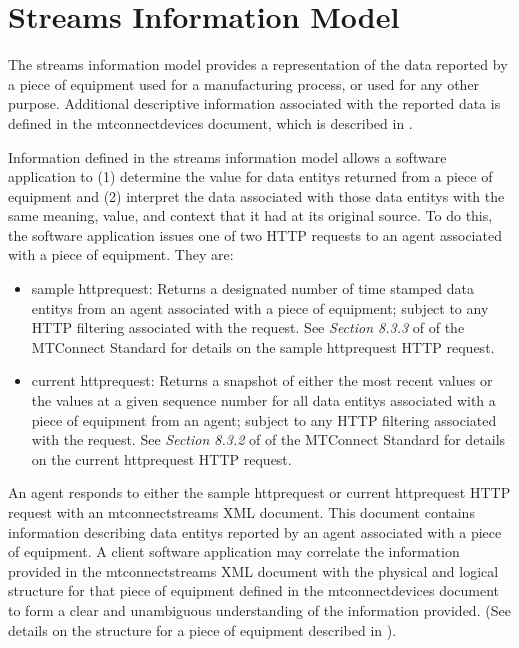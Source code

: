 \section{Streams Information Model}
\label{sec:Streams Information Model}

The \gls{streams information model} provides a representation of the data reported by a piece of equipment used for a manufacturing process, or used for any other purpose.  Additional descriptive information associated with the reported data is defined in the \gls{mtconnectdevices} document, which is described in .

Information defined in the \gls{streams information model} allows a software application to (1) determine the value for \glspl{data entity} returned from a piece of equipment and (2) interpret the data associated with those \glspl{data entity} with the same meaning, value, and context that it had at its original source.  To do this, the software application issues one of two HTTP requests to an \gls{agent} associated with a piece of equipment.  They are:


\begin{itemize}
\item \gls{sample httprequest}:  Returns a designated number of time stamped \glspl{data entity} from an \gls{agent} associated with a piece of equipment; subject to any HTTP filtering associated with the request.  See \textit{Section 8.3.3} of  of the MTConnect Standard for details on the \gls{sample httprequest} HTTP request.

\item \gls{current httprequest}:  Returns a snapshot of either the most recent values or the values at a given sequence number for all \glspl{data entity} associated with a piece of equipment from an \gls{agent}; subject to any HTTP filtering associated with the request.  See \textit{Section 8.3.2} of  of the MTConnect Standard for details on the \gls{current httprequest} HTTP request.
\end{itemize}

An \gls{agent} responds to either the \gls{sample httprequest} or \gls{current httprequest} HTTP request with an \linebreak\gls{mtconnectstreams} XML document.  This document contains information describing \glspl{data entity} reported by an \gls{agent} associated with a piece of equipment.   A client software application may correlate the information provided in the \gls{mtconnectstreams} XML document with the physical and logical structure for that piece of equipment defined in the \gls{mtconnectdevices} document to form a clear and unambiguous understanding of the information provided.  (See details on the structure for a piece of equipment described in ).

